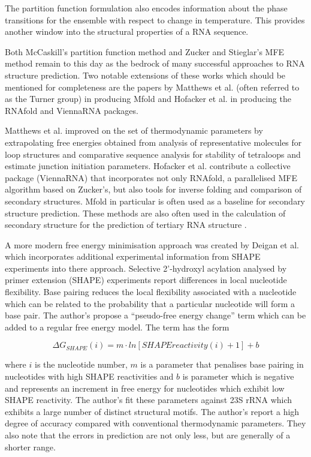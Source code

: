\documentclass[journal]{IEEEtran}
\begin{document}
The partition function formulation also encodes information about the phase transitions for the ensemble with respect to change in temperature. This provides another window into the structural properties of a RNA sequence.

Both McCaskill's partition function method and Zucker and Stieglar's MFE method remain to this day as the bedrock of many successful approaches to RNA structure prediction. Two notable extensions of these works which should be mentioned for completeness are the papers by Matthews et al. \cite{mathews1999expanded} (often referred to as the Turner group) in producing Mfold and Hofacker et al. \cite{hofacker1994fast} in producing the RNAfold and ViennaRNA packages. 

Matthews et al. improved on the set of thermodynamic parameters by extrapolating free energies obtained from analysis of representative molecules for loop structures and comparative sequence analysis for stability of tetraloops and estimate junction initiation parameters. Hofacker et al. contribute a collective package (ViennaRNA) that incorporates not only RNAfold, a parallelised MFE algorithm based on Zucker's, but also tools for inverse folding and comparison of secondary structures. Mfold in particular is often used as a baseline for secondary structure prediction. These methods are also often used in the calculation of secondary structure for the prediction of tertiary RNA structure \cite{laing2010computational, cruz2012rna, miao2015rna}.

A more modern free energy minimisation approach was created by Deigan et al. \cite{deigan2009accurate} which incorporates additional experimental information from SHAPE experiments into there approach. Selective 2'-hydroxyl acylation analysed by primer extension (SHAPE) experiments report differences in local nucleotide flexibility. Base pairing reduces the local flexibility associated with a nucleotide which can be related to the probability that a particular nucleotide will form a base pair. The author's propose a ``pseudo-free energy change'' term which can be added to a regular free energy model. The term has the form

\begin{equation}
	\Delta G_{SHAPE}(i) = m \cdot ln[SHAPEreactivity(i) + 1] + b
\end{equation}

where $i$ is the nucleotide number, $m$ is a parameter that penalises base pairing in nucleotides with high SHAPE reactivities and $b$ is parameter which is negative and represents an increment in free energy for nucleotides which exhibit low SHAPE reactivity. The author's fit these parameters against 23S rRNA which exhibits a large number of distinct structural motifs. The author's report a high degree of accuracy compared with conventional thermodynamic parameters. They also note that the errors in prediction are not only less, but are generally of a shorter range.
\end{document}
